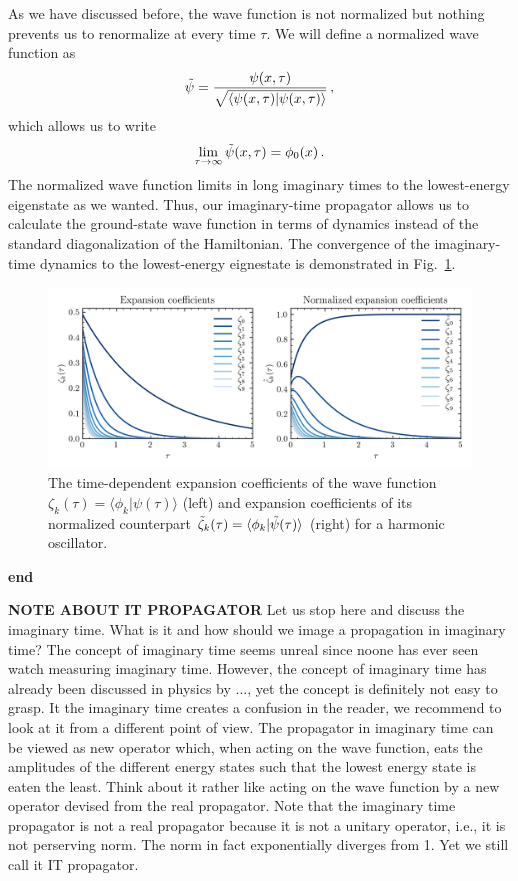 As we have discussed before, the wave function is not normalized but nothing prevents us to renormalize at every time $\tau$. We will define a normalized wave function as
\begin{equation}
    \Tilde{\psi} = \frac{\psi(x,\tau)}{\sqrt{\langle\psi(x,\tau) | \psi(x,\tau) \rangle}} \, ,
\end{equation}
which allows us to write 
\begin{equation}
    \lim_{\tau\to\infty} \Tilde{\psi}(x,\tau) = \phi_0(x) \, .
\end{equation}
The normalized wave function limits in long imaginary times to the lowest-energy eigenstate as we wanted. Thus, our imaginary-time propagator allows us to calculate the ground-state wave function in terms of dynamics instead of the standard diagonalization of the Hamiltonian. The convergence of the imaginary-time dynamics to the lowest-energy eignestate is demonstrated in Fig.~\ref{fig:itqd1}.

\begin{figure}[ht!]
    \centering
    \includegraphics[width=0.9\linewidth]{scriptum/obrazky/itqd/itqd1.png}
    \caption{The time-dependent expansion coefficients of the wave function $\zeta_k(\tau) = \langle \phi_k | \psi(\tau) \rangle$ (left) and expansion coefficients of its normalized counterpart $\Tilde{\zeta}_k(\tau) = \langle \phi_k | \Tilde{\psi}(\tau) \rangle$ (right) for a harmonic oscillator.}
    \label{fig:itqd1}
\end{figure}




\textbf{end}

\vspace{2cm}


\textbf{NOTE ABOUT IT PROPAGATOR}
Let us stop here and discuss the imaginary time. What is it and how should we image a propagation in imaginary time? The concept of imaginary time seems unreal since noone has ever seen watch measuring imaginary time. However, the concept of imaginary time has already been discussed in physics by ..., yet the concept is definitely not easy to grasp. It the imaginary time creates a confusion in the reader, we recommend to look at it from a different point of view. The propagator in imaginary time can be viewed as new operator which, when acting on the wave function, eats the amplitudes of the different energy states such that the lowest energy state is eaten the least. Think about it rather like acting on the wave function by a new operator devised from the real propagator. Note that the imaginary time propagator is not a real propagator because it is not a unitary operator, i.e., it is not perserving norm. The norm in fact exponentially diverges from 1. Yet we still call it IT propagator.

